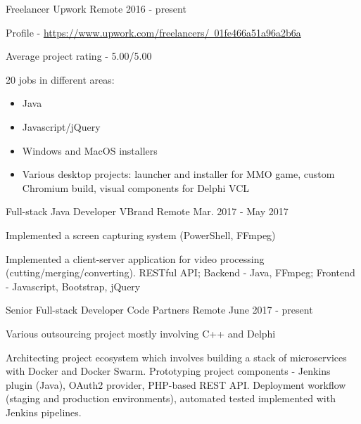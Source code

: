 \begin{cventries}
  \cventry
    {Freelancer} %
    {Upwork} %
    {Remote} %
    {2016 - present} %
    {
      \begin{cvitems} %
        \item {Profile - \href{https://www.upwork.com/freelancers/~01fe466a51a96a2b6a}{https://www.upwork.com/freelancers/~01fe466a51a96a2b6a}}
        \item {Average project rating - 5.00/5.00}
        \item {
        	20 jobs in different areas:
            \begin{itemize}
				\item Java
				\item Javascript/jQuery
				\item Windows and MacOS installers
            	\item Various desktop projects: launcher and installer for MMO game, custom Chromium build, visual components for Delphi VCL
			\end{itemize}
        }
      \end{cvitems}
    }

  \cventry
    {Full-stack Java Developer} %
    {VBrand} %
    {Remote} %
    {Mar. 2017 - May 2017} %
    {
      \begin{cvitems} %
        \item Implemented a screen capturing system (PowerShell, FFmpeg)
		\item Implemented a client-server application for video processing (cutting/merging/converting). RESTful API; Backend - Java, FFmpeg; Frontend - Javascript, Bootstrap, jQuery      
      \end{cvitems}
    }
    
  \cventry
    {Senior Full-stack Developer} %
    {Code Partners} %
    {Remote} %
    {June 2017 - present} %
    {
      \begin{cvitems} %
        \item Various outsourcing project mostly involving C++ and Delphi
		\item Architecting project ecosystem which involves building a stack of microservices with Docker and Docker Swarm. Prototyping project components - Jenkins plugin (Java), OAuth2 provider, PHP-based REST API. Deployment workflow (staging and production environments), automated tested implemented with Jenkins pipelines.
      \end{cvitems}
    }    

\end{cventries}
